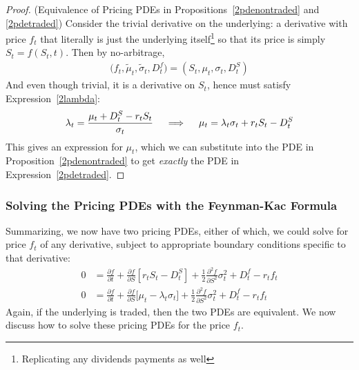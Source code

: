 \documentclass[12pt]{article}
\theoremstyle{plain}
\theoremstyle{definition}
\theoremstyle{remark}
\begin{document}
\begin{proof}
(Equivalence of Pricing PDEs in Propositions~\ref{2pdenontraded} and \ref{2pdetraded})
Consider the trivial derivative on the underlying: a derivative with
price $f_t$ that literally is just the underlying itself\footnote{%
  Replicating any dividends payments as well
}
so that its price is simply $S_t=f(S_t,t)$.
Then by no-arbitrage,
\begin{align*}
  \big(f_t,\tilde{\mu}_t,\tilde{\sigma}_t,D_t^f\big)
  =(S_t,{\mu}_t,{\sigma}_t,D_t^S)
\end{align*}
And even though trivial, it is a derivative on $S_t$, hence must satisfy
Expression~\ref{2lambda}:
\begin{align*}
  \lambda_t
  =
  \frac{%
    \mu_{t}+D_{t}^S
    -
    r_tS_{t}
  }{\sigma_{t}}
  \quad\implies\quad
  \mu_{t}
  =
  \lambda_t\sigma_{t}
  +
  r_tS_{t}
  -
  D_{t}^S
\end{align*}
This gives an expression for $\mu_t$, which we can substitute into the
PDE in Proposition~\ref{2pdenontraded} to get \emph{exactly} the PDE in
Expression~\ref{2pdetraded}.
\end{proof}


\clearpage
\subsubsection{Solving the Pricing PDEs with the Feynman-Kac Formula}

Summarizing, we now have two pricing PDEs, either of which, we could
solve for price $f_t$ of any derivative, subject to appropriate boundary
conditions specific to that derivative:
\begin{align*}
  0
  &=
  \frac{\partial f}{\partial t}
  +
  \frac{\partial f}{\partial S}
  \left[
  r_t
  S_t
  - D_t^S
  \right]
  +
  \frac{1}{2}
  \frac{\partial^2 f}{\partial S^2}
  \sigma^2_t
  +
  D_t^f
  -
  r_t
  f_t
  \\
  0
  &=
  \frac{\partial f}{\partial t}
  +
  \frac{\partial f}{\partial S}
  \big[
  \mu_t
  -
  \lambda_t
  \sigma_t
  \big]
  +
  \frac{1}{2}
  \frac{\partial^2 f}{\partial S^2}
  \sigma_t^2
  + D_t^f - r_tf_t
\end{align*}
Again, if the underlying is traded, then the two PDEs are equivalent.
We now discuss how to solve these pricing PDEs for the price $f_t$.
\end{document}
